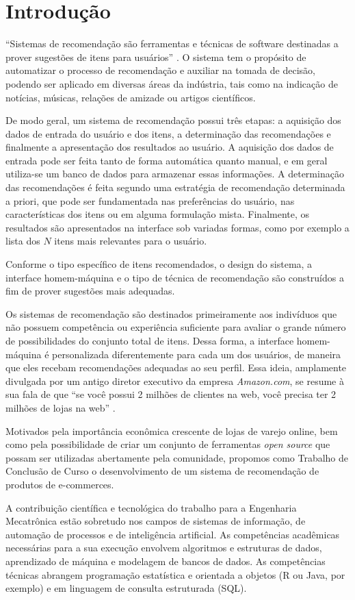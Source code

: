 \chapter[Introdução]{Introdução}
\label{chap:introducao}

``Sistemas de recomendação são ferramentas e técnicas de software destinadas a prover sugestões de itens para usuários'' \cite{ricci2011introduction-chap1}. O sistema tem o propósito de automatizar o processo de recomendação e auxiliar na tomada de decisão, podendo ser aplicado em diversas áreas da indústria, tais como na indicação de notícias, músicas, relações de amizade ou artigos científicos.

De modo geral, um sistema de recomendação possui três etapas: a aquisição dos dados de entrada do usuário e dos itens, a determinação das recomendações e finalmente a apresentação dos resultados ao usuário. A aquisição dos dados de entrada pode ser feita tanto de forma automática quanto manual, e em geral utiliza-se um banco de dados para armazenar essas informações. A determinação das recomendações é feita segundo uma estratégia de recomendação determinada a priori, que pode ser fundamentada nas preferências do usuário, nas características dos itens ou em alguma formulação mista. Finalmente, os resultados são apresentados na interface sob variadas formas, como por exemplo a lista dos $N$ itens mais relevantes para o usuário.   

Conforme o tipo específico de itens recomendados, o design do sistema, a interface homem-máquina e o tipo de técnica de recomendação são construídos a fim de prover sugestões mais adequadas.

Os sistemas de recomendação são destinados primeiramente aos indivíduos que não possuem competência ou experiência suficiente para avaliar o grande número de possibilidades do conjunto total de itens. Dessa forma, a interface homem-máquina é personalizada diferentemente para cada um dos usuários, de maneira que eles recebam recomendações adequadas ao seu perfil. Essa ideia, amplamente divulgada por um antigo diretor executivo da empresa \textit{Amazon.com}, se resume à sua fala de que ``se você possui 2 milhões de clientes na web, você precisa ter 2 milhões de lojas na web'' \cite{schafer1999recommender}. 

Motivados pela importância econômica crescente de lojas de varejo online, bem como pela possibilidade de criar um conjunto de ferramentas \textit{open source} que possam ser utilizadas abertamente pela comunidade, propomos como Trabalho de Conclusão de Curso o desenvolvimento de um sistema de recomendação de produtos de e-commerces.  

A contribuição científica e tecnológica do trabalho para a Engenharia Mecatrônica estão sobretudo nos campos de sistemas de informação, de automação de processos e de inteligência artificial. As competências acadêmicas necessárias para a sua execução envolvem algoritmos e estruturas de dados, aprendizado de máquina e modelagem de bancos de dados. As competências técnicas abrangem programação estatística e orientada a objetos (R ou Java, por exemplo) e em linguagem de consulta estruturada (SQL).